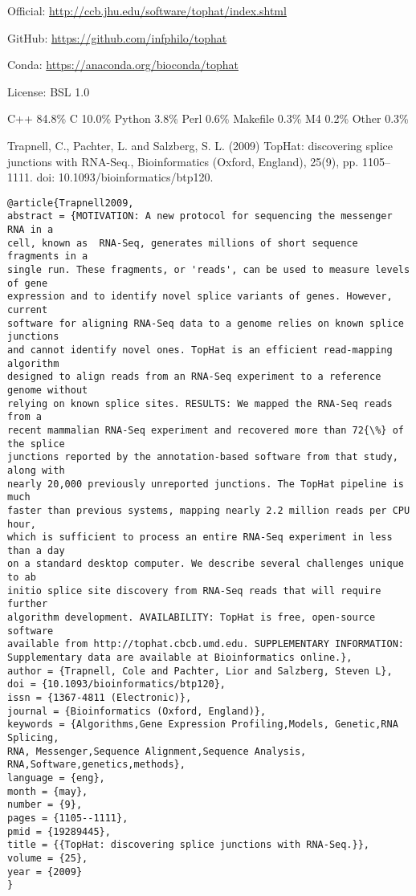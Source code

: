 \documentclass[]{article}
\begin{document}
Official: \url{http://ccb.jhu.edu/software/tophat/index.shtml}

GitHub: \url{https://github.com/infphilo/tophat}

Conda: \url{https://anaconda.org/bioconda/tophat}

License: BSL 1.0

C++ 84.8\% C 10.0\% Python 3.8\% Perl 0.6\% Makefile 0.3\% M4 0.2\% Other 0.3\%



Trapnell, C., Pachter, L. and Salzberg, S. L. (2009) TopHat: discovering splice junctions with RNA-Seq., Bioinformatics (Oxford, England), 25(9), pp. 1105–1111. doi: 10.1093/bioinformatics/btp120.

\begin{verbatim}
@article{Trapnell2009,
abstract = {MOTIVATION: A new protocol for sequencing the messenger RNA in a
cell, known as  RNA-Seq, generates millions of short sequence fragments in a
single run. These fragments, or 'reads', can be used to measure levels of gene
expression and to identify novel splice variants of genes. However, current
software for aligning RNA-Seq data to a genome relies on known splice junctions
and cannot identify novel ones. TopHat is an efficient read-mapping algorithm
designed to align reads from an RNA-Seq experiment to a reference genome without
relying on known splice sites. RESULTS: We mapped the RNA-Seq reads from a
recent mammalian RNA-Seq experiment and recovered more than 72{\%} of the splice
junctions reported by the annotation-based software from that study, along with
nearly 20,000 previously unreported junctions. The TopHat pipeline is much
faster than previous systems, mapping nearly 2.2 million reads per CPU hour,
which is sufficient to process an entire RNA-Seq experiment in less than a day
on a standard desktop computer. We describe several challenges unique to ab
initio splice site discovery from RNA-Seq reads that will require further
algorithm development. AVAILABILITY: TopHat is free, open-source software
available from http://tophat.cbcb.umd.edu. SUPPLEMENTARY INFORMATION:
Supplementary data are available at Bioinformatics online.},
author = {Trapnell, Cole and Pachter, Lior and Salzberg, Steven L},
doi = {10.1093/bioinformatics/btp120},
issn = {1367-4811 (Electronic)},
journal = {Bioinformatics (Oxford, England)},
keywords = {Algorithms,Gene Expression Profiling,Models, Genetic,RNA Splicing,
RNA, Messenger,Sequence Alignment,Sequence Analysis, RNA,Software,genetics,methods},
language = {eng},
month = {may},
number = {9},
pages = {1105--1111},
pmid = {19289445},
title = {{TopHat: discovering splice junctions with RNA-Seq.}},
volume = {25},
year = {2009}
}

\end{verbatim}
\end{document}
